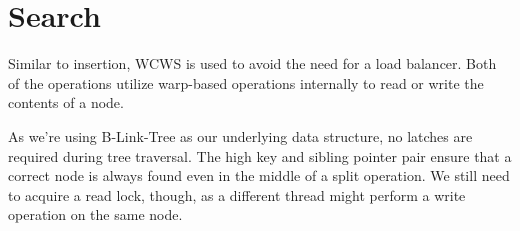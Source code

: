 \section{Search}

Similar to insertion, WCWS is used to avoid the need for a load balancer. Both of the operations utilize warp-based operations internally to read or write the contents of a node.

As we're using B-Link-Tree as our underlying data structure, no latches are required during tree traversal. The high key and sibling pointer pair ensure that a correct node is always found even in the middle of a split operation. We still need to acquire a read lock, though, as a different thread might perform a write operation on the same node.

